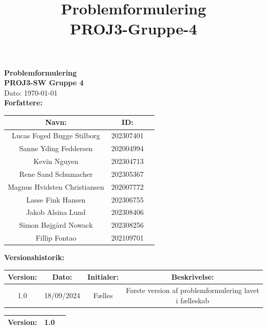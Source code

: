 \documentclass{article}
\title{Problemformulering \\ \large PROJ3-Gruppe-4}
\begin{document}
\begin{titlepage}
    \centering
    \vspace*{4cm}
    {\Huge \textbf{Problemformulering}} \\[1cm]
    {\Large \textbf{PROJ3-SW Gruppe 4}} \\[1cm]
    {\large Dato: \today}\\[0.5cm]
    \textbf{Forfattere:} \\[0.2cm]
    \begin{center}
        \begin{tabular}{|c|c|c|}
            \hline
            \textbf{Navn:} & \textbf{ID:} \\
            \hline
            Lucas Foged Bugge Stilborg & 202307401 \\
            \hline
            Sanne Yding Feddersen  & 202004994 \\
            \hline
            Kevin Nguyen  & 202304713 \\
            \hline
            Rene Sand Schumacher  & 202305367 \\
            \hline
            Magnus Hvidsten Christiansen & 202007772 \\
            \hline
            Lasse Fink Hansen & 202306755\\
            \hline
            Jakob Alsina Lund & 202308406 \\
            \hline
            Simon Bøjgård Nowack & 202308256\\
            \hline
            Fillip Fontao & 202109701\\
            \hline
        \end{tabular}
    \end{center}
    \textbf{Versionshistorik:} \\[0.2cm]
    \begin{center}
        \begin{tabular}{|c|c|c|c|}
            \hline
            \textbf{Version:} & \textbf{Dato:} & \textbf{Initialer:} & \textbf{Beskrivelse:} \\
            \hline
            1.0 & 18/09/2024 & Fælles & Første version af problemformulering lavet i fælleskab \\
            \hline
        \end{tabular}
    \end{center}
    \vfill
    \begin{center}
        \begin{tabular}{|c|c|c|}
            \hline
            \textbf{Version:} & 1.0 \\
            \hline
        \end{tabular}
    \end{center}
\end{titlepage}
\end{document}

